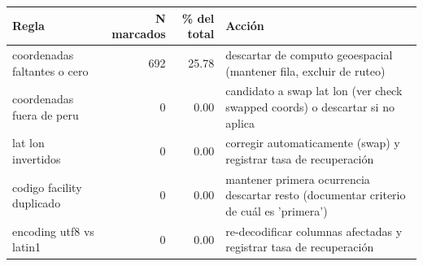 \begin{tabular}{lrrp{6cm}}
\toprule
Regla & N marcados & \% del total & Acción \\
\midrule
coordenadas faltantes o cero & 692 & 25.78 & descartar de computo geoespacial (mantener fila, excluir de ruteo) \\
coordenadas fuera de peru & 0 & 0.00 & candidato a swap lat lon (ver check swapped coords) o descartar si no aplica \\
lat lon invertidos & 0 & 0.00 & corregir automaticamente (swap) y registrar tasa de recuperación \\
codigo facility duplicado & 0 & 0.00 & mantener primera ocurrencia descartar resto (documentar criterio de cuál es 'primera') \\
encoding utf8 vs latin1 & 0 & 0.00 & re-decodificar columnas afectadas y registrar tasa de recuperación \\
\bottomrule
\end{tabular}
